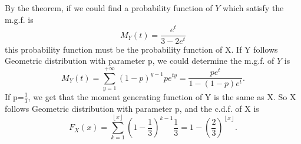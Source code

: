\documentclass[10.5pt]{article}
\begin{document}
\section{}
By the theorem, if we could find a probability function of $Y$ which satisfy the m.g.f. is $$M_{Y}(t) = \frac{e^t}{3-2e^t}$$\indent this probability function must be the probability function of X. If Y follows Geometric distribution with parameter p, we could determine the m.g.f. of $Y$ is $$M_{Y}(t) = \sum_{y=1}^{+\infty} (1-p)^{y-1}p e^{ty} = \frac{pe^t}{1-(1-p)e^t}.$$\indent
If p=$\frac{1}{3}$, we get that the moment generating function of Y is the same as X. So X follows Geometric distribution with parameter p, and the c.d.f. of X is $$F_X(x) = \sum_{k=1}^{\left\lfloor x\right\rfloor} \left(1-\frac{1}{3}\right)^{k-1}\frac{1}{3}= 1-\left(\frac{2}{3}\right)^{\left\lfloor x\right\rfloor}.$$
\end{document}
